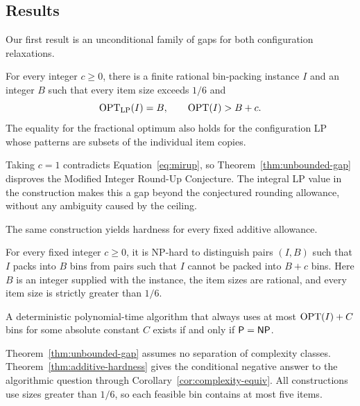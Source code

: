 \subsection{Results}

Our first result is an unconditional family of gaps for both
configuration relaxations.

\begin{theorem}\label{thm:unbounded-gap}
For every integer $c\ge0$, there is a finite rational bin-packing instance
$I$ and an integer $B$ such that every item size exceeds $1/6$ and
\begin{equation}\label{eq:main-gap}
  \operatorname{OPT}_{\mathrm{LP}}(I)=B,
  \qquad \operatorname{OPT}(I)>B+c.
\end{equation}
The equality for the fractional optimum also holds for the configuration
LP whose patterns are subsets of the individual item copies.
\end{theorem}

Taking $c=1$ contradicts Equation~\eqref{eq:mirup}, so
Theorem~\ref{thm:unbounded-gap} disproves the Modified Integer Round-Up
Conjecture. The integral LP value in the construction makes this a gap
beyond the conjectured rounding allowance, without any ambiguity caused
by the ceiling.

The same construction yields hardness for every fixed additive allowance.

\begin{theorem}\label{thm:additive-hardness}
For every fixed integer $c\ge0$, it is NP-hard to distinguish pairs $(I,B)$
such that $I$ packs into $B$ bins from pairs such that $I$ cannot be packed
into $B+c$ bins.  Here $B$ is an integer supplied with the instance,
the item sizes are rational, and every item size is strictly greater
than $1/6$.
\end{theorem}

\begin{corollary}\label{cor:complexity-equiv}
A deterministic polynomial-time algorithm that always uses at most
$\operatorname{OPT}(I)+C$ bins for some absolute constant $C$ exists if and only if
$\mathsf P=\mathsf{NP}$.
\end{corollary}

Theorem~\ref{thm:unbounded-gap} assumes no separation of complexity
classes. Theorem~\ref{thm:additive-hardness} gives the conditional negative
answer to the algorithmic question through
Corollary~\ref{cor:complexity-equiv}. All constructions use sizes greater
than $1/6$, so each feasible bin contains at most five items.

